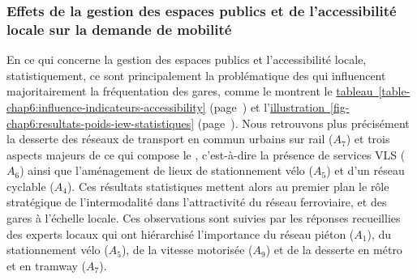 \begin{refsegment}
\subsubsection*{Effets de la gestion des espaces publics et de l'accessibilité locale sur la demande de mobilité
    \label{chap6:results-influence-indicateurs-accessibility}
    }

En ce qui concerne la gestion des espaces publics et l'accessibilité locale, statistiquement, ce sont principalement la problématique des  qui influencent majoritairement la fréquentation des gares, comme le montrent le \hyperref[table-chap6:influence-indicateurs-accessibility]{tableau~\ref{table-chap6:influence-indicateurs-accessibility}} (page~\pageref{table-chap6:influence-indicateurs-accessibility}) et l'\hyperref[fig-chap6:resultats-poids-iew-statistiques]{illustration~\ref{fig-chap6:resultats-poids-iew-statistiques}} (page~\pageref{fig-chap6:resultats-poids-iew-statistiques}). Nous retrouvons plus précisément la desserte des réseaux de transport en commun urbains sur rail (\(A_{7}\)) et trois aspects majeurs de ce qui compose le  \textcolor{blue}{\autocites[169]{heran_retour_2015}[]{heran_systeme_2001}}, c'est-à-dire la présence de services \acrshort{VLS} (\(A_{6}\)) ainsi que l'aménagement de lieux de stationnement vélo (\(A_{5}\)) et d'un réseau cyclable (\(A_{4}\)). Ces résultats statistiques mettent alors au premier plan le rôle stratégique de l'\gls{intermodalité} dans l'attractivité du réseau ferroviaire, et des gares à l'échelle locale. Ces observations sont suivies par les réponses recueillies des experts locaux qui ont hiérarchisé l'importance du réseau piéton (\(A_{1}\)), du stationnement vélo (\(A_{5}\)), de la vitesse motorisée (\(A_{9}\)) et de la desserte en métro et en tramway (\(A_{7}\)).



\end{refsegment}
